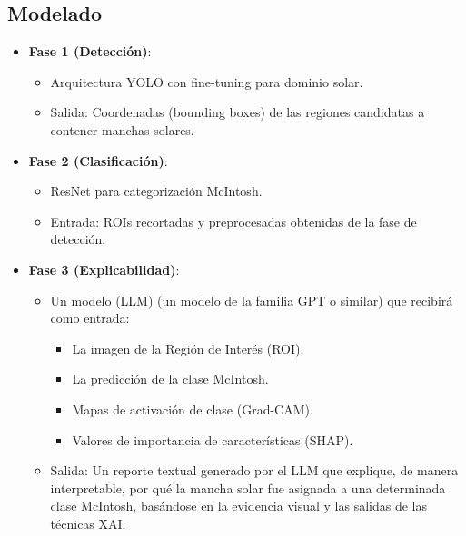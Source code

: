 \documentclass[conference]{IEEEtran}
\begin{document}
\subsection*{Modelado}
\begin{itemize}
    \item \textbf{Fase 1 (Detección)}:
          \begin{itemize}
              \item Arquitectura YOLO con fine-tuning para dominio solar.
              \item Salida: Coordenadas (bounding boxes) de las regiones candidatas a contener manchas solares.
          \end{itemize}
    \item \textbf{Fase 2 (Clasificación)}:
          \begin{itemize}
              \item ResNet para categorización McIntosh.
              \item Entrada: ROIs recortadas y preprocesadas obtenidas de la fase de detección.
          \end{itemize}
    \item \textbf{Fase 3 (Explicabilidad)}:
          \begin{itemize}
              \item Un modelo (LLM) (un modelo de la familia GPT o similar) que recibirá como entrada:
                    \begin{itemize}
                        \item La imagen de la Región de Interés (ROI).
                        \item La predicción de la clase McIntosh.
                        \item Mapas de activación de clase (Grad-CAM).
                        \item Valores de importancia de características (SHAP).
                    \end{itemize}
              \item Salida: Un reporte textual generado por el LLM que explique, de manera interpretable, por qué la mancha solar fue asignada a una determinada clase McIntosh, basándose en la evidencia visual y las salidas de las técnicas XAI.
          \end{itemize}
\end{itemize}
\end{document}
